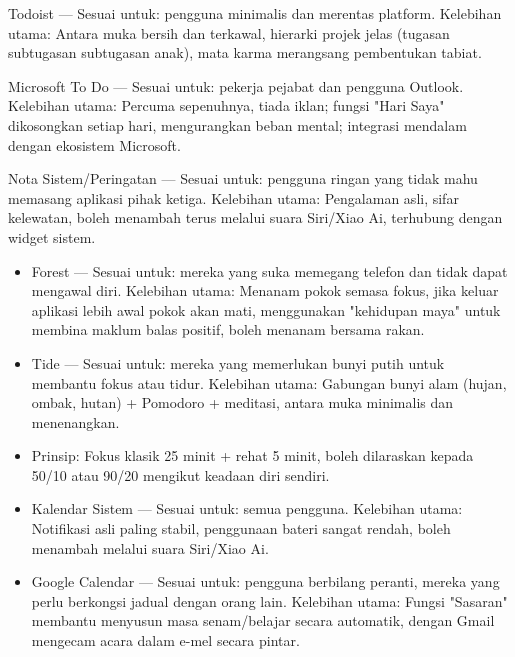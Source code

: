 Todoist — Sesuai untuk: pengguna minimalis dan merentas platform. Kelebihan utama: Antara muka bersih dan terkawal, hierarki projek jelas (tugasan subtugasan subtugasan anak), mata karma merangsang pembentukan tabiat.

Microsoft To Do — Sesuai untuk: pekerja pejabat dan pengguna Outlook. Kelebihan utama: Percuma sepenuhnya, tiada iklan; fungsi "Hari Saya" dikosongkan setiap hari, mengurangkan beban mental; integrasi mendalam dengan ekosistem Microsoft.

Nota Sistem/Peringatan — Sesuai untuk: pengguna ringan yang tidak mahu memasang aplikasi pihak ketiga. Kelebihan utama: Pengalaman asli, sifar kelewatan, boleh menambah terus melalui suara Siri/Xiao Ai, terhubung dengan widget sistem.


\begin{itemize}
  \item Forest — Sesuai untuk: mereka yang suka memegang telefon dan tidak dapat mengawal diri. Kelebihan utama: Menanam pokok semasa fokus, jika keluar aplikasi lebih awal pokok akan mati, menggunakan "kehidupan maya" untuk membina maklum balas positif, boleh menanam bersama rakan.
  \item Tide — Sesuai untuk: mereka yang memerlukan bunyi putih untuk membantu fokus atau tidur. Kelebihan utama: Gabungan bunyi alam (hujan, ombak, hutan) + Pomodoro + meditasi, antara muka minimalis dan menenangkan.
  \item Prinsip: Fokus klasik 25 minit + rehat 5 minit, boleh dilaraskan kepada 50/10 atau 90/20 mengikut keadaan diri sendiri.
\end{itemize}


\begin{itemize}
  \item Kalendar Sistem — Sesuai untuk: semua pengguna. Kelebihan utama: Notifikasi asli paling stabil, penggunaan bateri sangat rendah, boleh menambah melalui suara Siri/Xiao Ai.
  \item Google Calendar — Sesuai untuk: pengguna berbilang peranti, mereka yang perlu berkongsi jadual dengan orang lain. Kelebihan utama: Fungsi "Sasaran" membantu menyusun masa senam/belajar secara automatik, dengan Gmail mengecam acara dalam e-mel secara pintar.
\end{itemize}


